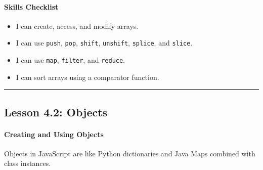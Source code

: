 \documentclass[
  justified,
  openright,
]{tufte-book}
\let\subsubsection\paragraph
\let\paragraph\paragraph
\let\subsubsection\paragraph
\let\paragraph\paragraph
\providecommand{\tightlist}{%
  \setlength{\itemsep}{0pt}\setlength{\parskip}{0pt}}
\begin{document}
\subsubsection{Skills Checklist}\label{skills-checklist-8}

\begin{itemize}
\tightlist
\item[$\square$]
  I can create, access, and modify arrays.
\item[$\square$]
  I can use \texttt{push}, \texttt{pop}, \texttt{shift},
  \texttt{unshift}, \texttt{splice}, and \texttt{slice}.
\item[$\square$]
  I can use \texttt{map}, \texttt{filter}, and \texttt{reduce}.
\item[$\square$]
  I can sort arrays using a comparator function.
\end{itemize}

\begin{center}\rule{0.5\linewidth}{0.5pt}\end{center}

\subsection{Lesson 4.2: Objects}\label{lesson-4.2-objects-1}

\subsubsection{Creating and Using
Objects}\label{creating-and-using-objects}

Objects in JavaScript are like Python dictionaries and Java Maps
combined with class instances.
\end{document}
